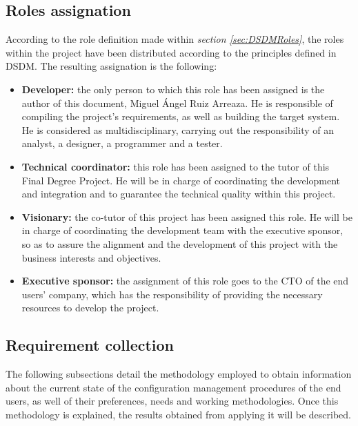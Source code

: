 \subsection{Roles assignation}

According to the role definition made within \emph{section \ref{sec:DSDMRoles}}, the roles within the project have been distributed according to the principles defined in
\acrshort{DSDM}. The resulting assignation is the following:

\begin{itemize}
    \item \textbf{Developer: }the only person to which this role has been assigned is the author of this document, Miguel Ángel Ruiz Arreaza. He is responsible of compiling
    the project's requirements, as well as building the target system. He is considered as multidisciplinary, carrying out the responsibility of an analyst, a designer,
    a programmer and a tester.

    \item \textbf{Technical coordinator: }this role has been assigned to the tutor of this Final Degree Project. He will be in charge of coordinating
    the development and integration and to guarantee the technical quality within this project.

    \item \textbf{Visionary: }the co-tutor of this project has been assigned this role. He will be in charge of coordinating the development
    team with the executive sponsor, so as to assure the alignment and the development of this project with the business interests and objectives.

    \item \textbf{Executive sponsor: }the assignment of this role goes to the \acrshort{CTO} of the end users' company, which has the responsibility of providing the necessary
    resources to develop the project.
\end{itemize}

\subsection{Requirement collection}

The following subsections detail the methodology employed to obtain information about the current state of the configuration management procedures of the end users, as well of
their preferences, needs and working methodologies. Once this methodology is explained, the results obtained from applying it will be described.


